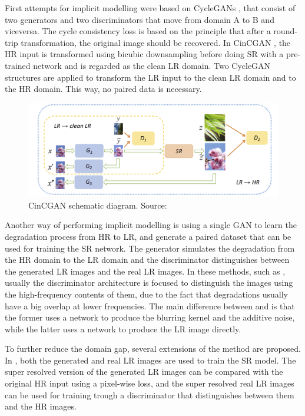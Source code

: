         First attempts for implicit modelling were based on CycleGANs \cite{CycleGAN2017}, that consist of two generators and two discriminators that move from domain A to B and viceversa. 
        The cycle consistency loss is based on the principle that after a round-trip transformation, the original image should be recovered.
        In CinCGAN \cite{yuan2018unsupervised}, the HR input is transformed using bicubic downsampling before doing SR with a pre-trained network and is regarded as the clean LR domain.
        Two CycleGAN structures are applied to transform the LR input to the clean LR domain and to the HR domain. 
        This way, no paired data is necessary.

        \begin{figure}[H]
            \centering
            \includegraphics[width=\textwidth]{Includes/4-ccingan.png}
            \caption{CinCGAN schematic diagram. Source: \cite{yuan2018unsupervised}}    
            \label{fig:2-CinCGAN}
        \end{figure}

        Another way of performing implicit modelling is using a single GAN to learn the degradation process from HR to LR, and generate a  paired dataset that can be used for training the SR network.
        The generator simulates the degradation from the HR domain to the LR domain and the discriminator distinguishes between the generated LR images and the real LR images.
        In these methods, such as \cite{luo2022learning,bulat2018learn}, usually the discriminator architecture is focused to distinguish the images using the high-frequency contents of them, due to the fact that degradations usually have a big overlap at lower frequencies. The main difference between \cite{luo2022learning} and \cite{bulat2018learn} is that the former uses a network to produce the blurring kernel and the additive noise, while the latter uses a network to produce the LR image directly.
        
        To further reduce the domain gap, several extensions of the method are proposed. 
        In \cite{wei2020unsupervised}, both the generated and real LR images are used to train the SR model.
        The super resolved version of the generated LR images can be compared with the original HR input using a pixel-wise loss, and the super resolved real LR images can be used for training trough a discriminator that distinguishes between them and the HR images.


